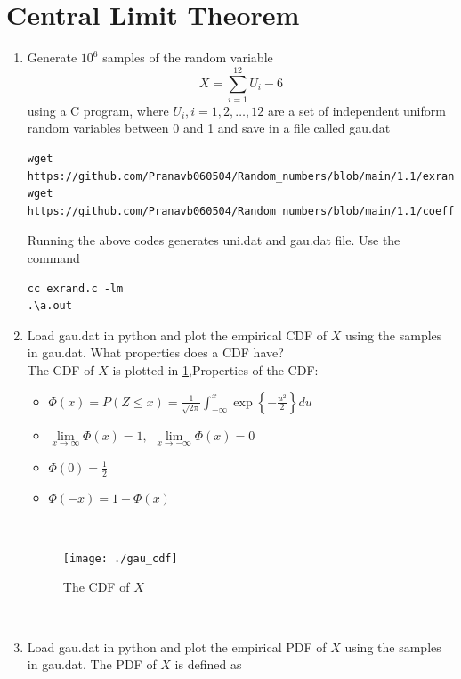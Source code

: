 \documentclass[journal,12pt,twocolumn]{IEEEtran}
\renewcommand\thesection{\arabic{section}}
\begin{document}
\section{Central Limit Theorem}
%
\begin{enumerate}[label=\thesection.\arabic*
,ref=\thesection.\theenumi]

%
\item
Generate $10^6$ samples of the random variable
%
\begin{equation}
X = \sum_{i=1}^{12}U_i -6
\end{equation}
%
using a C program, where $U_i, i = 1,2,\dots, 12$ are  a set of independent uniform random variables between 0 and 1
and save in a file called gau.dat
\\
\solution
\begin{lstlisting}
wget https://github.com/Pranavb060504/Random_numbers/blob/main/1.1/exrand.c
wget https://github.com/Pranavb060504/Random_numbers/blob/main/1.1/coeffs.h
\end{lstlisting}
Running the above codes generates uni.dat and gau.dat file.
Use the command 
\begin{lstlisting}
cc exrand.c -lm
.\a.out
\end{lstlisting}
%
\item
Load gau.dat in python and plot the empirical CDF of $X$ using the samples in gau.dat. What properties does a CDF have?
\\
\solution 
The CDF of $X$ is plotted in \ref{fig:gau_cdf},Properties of the CDF:
\begin{itemize}
\item $\Phi(x)=P(Z \leq x)= \frac{1}{\sqrt{2 \pi}} \int_{-\infty}^{x}\exp\left\{-\frac{u^2}{2}\right\} du$
\item $\lim \limits_{x\rightarrow \infty} \Phi(x)=1, \hspace{5pt} \lim \limits_{x\rightarrow -\infty} \Phi(x)=0$
\item  $\Phi(0)=\frac{1}{2}$
\item  $\Phi(-x)=1-\Phi(x)$
\end{itemize}
\\
\begin{figure}[h]
\centering
\texttt{[image: ./gau\_cdf]}
\caption{The CDF of $X$}
\label{fig:gau_cdf}
\end{figure}
\\
\item
Load gau.dat in python and plot the empirical PDF of $X$ using the samples in gau.dat. The PDF of $X$ is defined as
\begin{align}

\end{align}
\end{enumerate}
\end{document}
